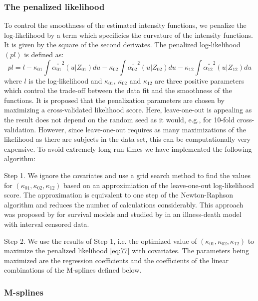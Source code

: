 \documentclass[article]{jss}
\begin{document}
\subsubsection{The penalized likelihood}
\label{sec-3-2-1}

To control the smoothness of the estimated intensity functions, we
penalize the log-likelihood by a term which specificies the curvature
of the intensity functions. It is given by the square of the second
derivates. The penalized log-likelihood \((pl)\) is defined as:
\begin{equation}
\label{eq:77}
pl = l - \kappa_{01} \int {\alpha_{01} ^{''} }^2 (u|Z_{01}) du  - \kappa_{02} \int {\alpha_{02} ^{''} }^2 (u|Z_{02}) du
- \kappa_{12} \int {\alpha_{12} 
^{''} }^2 (u|Z_{12}) du
\end{equation}
where \(l\) is the log-likelihood and \(\kappa_{01}\), \(\kappa_{02}\) and
\(\kappa_{12}\) are three positive parameters which control the
trade-off between the data fit and the smoothness of the functions. It
is proposed that the penalization parameters are chosen by maximizing
a cross-validated likelihood score. Here, leave-one-out is appealing
as the result does not depend on the random seed as it would, e.g.,
for 10-fold cross-validation.  However, since leave-one-out requires
as many maximizations of the likelihood as there are subjects in the
data set, this can be computationally very expensive. To avoid
extremely long run times we have implemented the following algorithm:

Step 1. We ignore the covariates and use a grid search method to find
 the values for \((\kappa_{01}, \kappa_{02}, \kappa_{12})\) based on an
 approximiation of the leave-one-out log-likelihood score.  The
 approximation is equivalent to one step of the Newton-Raphson
 algorithm and reduces the number of calculations considerably. This
 approach was proposed by \citet{O'Sullivan_1988} for survival models
 and studied by \citet{Joly_Commenges_Helmer_Letenneur_2002} in an
 illness-death model
with interval censored data.

Step 2. We use the results of Step 1, i.e. the optimized value of
  \((\kappa_{01}, \kappa_{02}, \kappa_{12})\) to maximize the penalized
  likelihood \eqref{eq:77} with covariates. The parameters being
  maximized are the regression coefficients and the coefficients of
  the linear combinations of the M-splines defined below.
\subsubsection{M-splines}
\label{sec-3-2-2}
\end{document}
